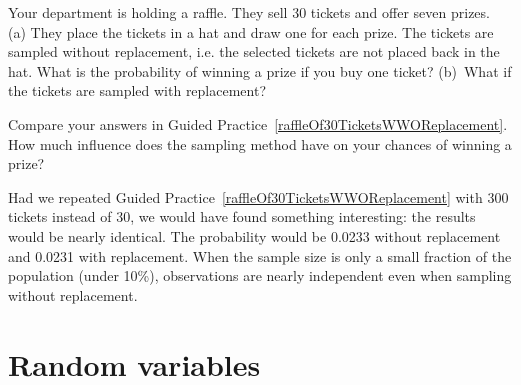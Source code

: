 \begin{exercisewrap}
\begin{nexercise} \label{raffleOf30TicketsWWOReplacement}
Your department is holding a raffle. They sell 30 tickets and offer seven prizes. (a) They place the tickets in a hat and draw one for each prize. The tickets are sampled without replacement, i.e. the selected tickets are not placed back in the hat. What is the probability of winning a prize if you buy one ticket? (b)~What if the tickets are sampled with replacement?\footnotemark
\end{nexercise}
\end{exercisewrap}

\begin{exercisewrap}
\begin{nexercise} \label{followUpToRaffleOf30TicketsWWOReplacement}
Compare your answers in Guided Practice~\ref{raffleOf30TicketsWWOReplacement}. How much influence does the sampling method have on your chances of winning a prize?\footnotemark
\end{nexercise}
\end{exercisewrap}

Had we repeated Guided Practice~\ref{raffleOf30TicketsWWOReplacement} with 300 tickets instead of 30, we would have found something interesting: the results would be nearly identical. The probability would be 0.0233 without replacement and 0.0231 with replacement. When the sample size is only a small fraction of the population (under 10\%), observations are nearly independent even when sampling without replacement.



\section{Random variables}
\label{randomVariablesSection}

